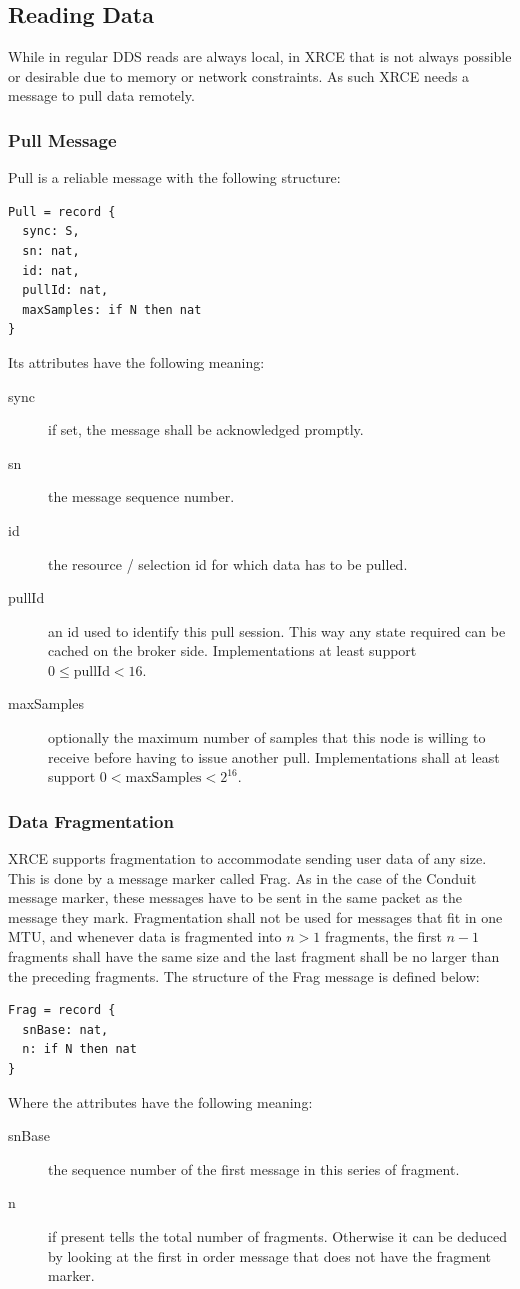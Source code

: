 \documentclass[a4paper,oneside,article]{memoir}
\begin{document}
\subsection{Reading Data}

While in regular DDS reads are always local, in XRCE that is not always possible or desirable
due to memory or network constraints.  As such XRCE needs a message to pull data remotely.

\subsubsection{Pull Message}
Pull is a reliable message with the following structure:
\begin{verbatim}
Pull = record {
  sync: S,
  sn: nat,
  id: nat,
  pullId: nat,
  maxSamples: if N then nat
}
\end{verbatim}
Its attributes have the following meaning:
\begin{description}
\item[sync] if set, the message shall be acknowledged promptly.
\item[sn] the message sequence number.
\item[id] the resource / selection id for which data has to be pulled.
\item[pullId] an id used to identify this pull session.  This way any state required can be cached
  on the broker side. Implementations at least support $0 ≤ \mathrm{pullId} < 16$.
\item[maxSamples] optionally the maximum number of samples that this node is willing to receive
  before having to issue another pull.  Implementations shall at least support
  $0 < \mathrm{maxSamples} < 2^{16}$.
\end{description}

\subsubsection{Data Fragmentation}

XRCE supports fragmentation to accommodate sending user data of any size.  This is done by a message
marker called Frag.  As in the case of the Conduit message marker, these messages have to be sent in
the same packet as the message they mark.  Fragmentation shall not be used for messages that fit in
one MTU, and whenever data is fragmented into $n > 1$ fragments, the first $n - 1$ fragments shall
have the same size and the last fragment shall be no larger than the preceding fragments.  The
structure of the Frag message is defined below:
\begin{verbatim}
Frag = record {
  snBase: nat,
  n: if N then nat
}
\end{verbatim}
Where the attributes have the following meaning:
\begin{description}
\item[snBase] the sequence number of the first message in this series of fragment.
\item[n] if present tells the total number of fragments. Otherwise it can be deduced by looking at
  the first in order message that does not have the fragment marker.
\end{description}
\end{document}
